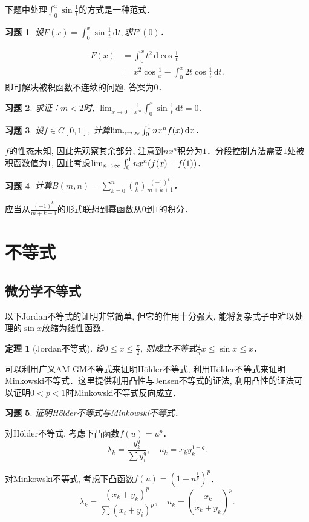 \documentclass[11pt,a4paper]{ctexart}
\makeatletter
\theoremstyle{thmseries} %
\newtheorem{thm}{定理}[section]
\theoremstyle{exerseries}
\newtheorem{exer}{习题}[section]
\renewenvironment{proof}[1][\proofname]{\par
  \pushQED{\qed}%
  \normalfont \topsep6\p@\@plus6\p@\relax
  \trivlist
  \item[\hskip\labelsep
        \itshape
    #1\@addpunct{}]\ignorespaces
}{%
  \popQED\endtrivlist\@endpefalse
}
\newenvironment{sol}{\begin{proof}[\bfseries\upshape 解\quad]}{\end{proof}}
\newenvironment{pf}{\begin{proof}[\bfseries\upshape 证\quad]}{\end{proof}}
\newcommand{\bra}[1]{\mathopen{}\left(#1\right)}
\renewcommand{\d}{\mathrm{d}}
\def \nti {\mathnormal{n}\to\infty}
\makeatother
\begin{document}
下题中处理$\int_{0}^{x}\sin\frac{1}{t}$的方式是一种范式．
\begin{exer}
	设$F(x)=\int_{0}^{x}\sin\frac{1}{t}\,\d t,$求$F'(0)$．
\end{exer}
\begin{sol}
	\begin{align*}
		F(x)&=\int_{0}^{x}t^2\,\d\cos\frac{1}{t}\\
		&=x^2\cos\frac{1}{x}-\int_{0}^{x}2t\cos\frac{1}{t}\,\d t.
	\end{align*}
	即可解决被积函数不连续的问题, 答案为$0$．
\end{sol}

\begin{exer}
	求证：$m<2$时, $\lim_{x\to0^+}\frac{1}{x^m}\int_{0}^{x}\sin\frac{1}{t}\,\d t=0$．
\end{exer}

\begin{exer}
	设$f\in C[0,1]$, 计算$\lim_{\nti}\int_{0}^{1}nx^nf(x)\,\d x$．
\end{exer}
\begin{sol}
	$f$的性态未知, 因此先观察其余部分, 注意到$nx^n$积分为$1$．分段控制方法需要$1$处被积函数值为$1$, 因此考虑$\lim_{\nti}\int_{0}^{1}nx^n\bra{f(x)-f(1)}$．
\end{sol}

\begin{exer}
	计算$B(m,n)=\sum_{k=0}^{n}\binom{n}{k}\frac{(-1)^k}{m+k+1}$．
\end{exer}
\begin{sol}
	应当从$\frac{(-1)^k}{m+k+1}$的形式联想到幂函数从$0$到$1$的积分．
\end{sol}


\section{不等式}
\subsection{微分学不等式}
以下Jordan不等式的证明非常简单, 但它的作用十分强大, 能将复杂式子中难以处理的$\sin x$放缩为线性函数．
\begin{thm}[Jordan不等式]
	设$0\leq x\leq\frac{\pi}{2}$, 则成立不等式$\frac{2}{\pi}x\leq\sin x\leq x$．
\end{thm}

可以利用广义AM-GM不等式来证明H\"older不等式, 利用H\"older不等式来证明Minkowski不等式．这里提供利用凸性与Jensen不等式的证法, 利用凸性的证法可以证明$0<p<1$时Minkowski不等式反向成立．
\begin{exer}
	证明H\"older不等式与Minkowski不等式．
\end{exer}
\begin{pf}
	对H\"older不等式, 考虑下凸函数$f(u)=u^p$．
	\[\lambda_k=\frac{y_k^q}{\sum y_i^q},\quad u_k=x_ky_k^{1-q}.\]

	对Minkowski不等式, 考虑下凸函数$f(u)=\bra{1-u^{\frac{1}{p}}}^p$．
	\[\lambda_k=\frac{(x_k+y_k)^p}{\sum(x_i+y_i)^p},\quad u_k=\bra{\frac{x_k}{x_k+y_k}}^p.\]
\end{pf}
\end{document}
